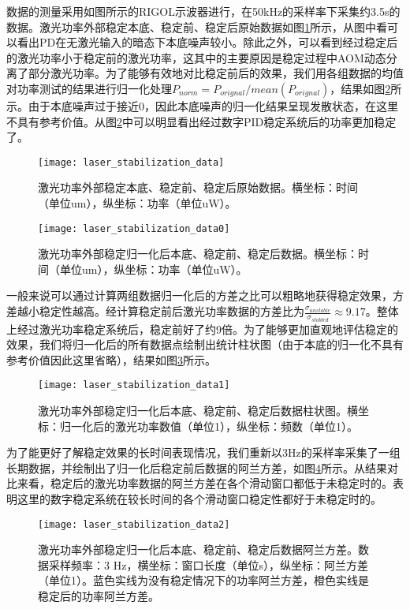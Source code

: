 数据的测量采用如图所示的RIGOL示波器进行，在50kHz的采样率下采集约3.5s的数据。激光功率外部稳定本底、稳定前、稳定后原始数据如图\ref{fig:laser_stabilization_data}所示，从图中看可以看出PD在无激光输入的暗态下本底噪声较小。除此之外，可以看到经过稳定后的激光功率小于稳定前的激光功率，这其中的主要原因是稳定过程中AOM动态分离了部分激光功率。为了能够有效地对比稳定前后的效果，我们用各组数据的均值对功率测试的结果进行归一化处理$P_{norm}=P_{orignal}/mean(P_{orignal})$，结果如图\ref{fig:laser_stabilization_data0}所示。由于本底噪声过于接近0，因此本底噪声的归一化结果呈现发散状态，在这里不具有参考价值。从图\ref{fig:laser_stabilization_data0}中可以明显看出经过数字PID稳定系统后的功率更加稳定了。

\begin{figure}
    \centering
    \caption[激光功率外部稳定原始数据]{激光功率外部稳定本底、稳定前、稳定后原始数据。横坐标：时间（单位um），纵坐标：功率（单位uW）。\label{fig:laser_stabilization_data}}
    \texttt{[image: laser\_stabilization\_data]}
\end{figure}

\begin{figure}
    \centering
    \caption[激光功率外部稳定归一化后数据]{激光功率外部稳定归一化后本底、稳定前、稳定后数据。横坐标：时间（单位um），纵坐标：功率（单位uW）。\label{fig:laser_stabilization_data0}}
    \texttt{[image: laser\_stabilization\_data0]}
\end{figure}

一般来说可以通过计算两组数据归一化后的方差之比可以粗略地获得稳定效果，方差越小稳定性越高。经计算稳定前后激光功率数据的方差比为$\frac{\sigma_{unstable}}{\sigma_{stabled}}\approx 9.17$。整体上经过激光功率稳定系统后，稳定前好了约9倍。为了能够更加直观地评估稳定的效果，我们将归一化后的所有数据点绘制出统计柱状图（由于本底的归一化不具有参考价值因此这里省略），结果如图\ref{fig:laser_stabilization_data1}所示。
\begin{figure}
    \centering
    \caption[激光功率外部稳定柱状图对比数据]{激光功率外部稳定归一化后本底、稳定前、稳定后数据柱状图。横坐标：归一化后的激光功率数值（单位1），纵坐标：频数（单位1）。\label{fig:laser_stabilization_data1}}
    \texttt{[image: laser\_stabilization\_data1]}
\end{figure}

为了能更好了解稳定效果的长时间表现情况，我们重新以3Hz的采样率采集了一组长期数据，并绘制出了归一化后稳定前后数据的阿兰方差，如图\ref{fig:laser_stabilization_data2}所示。从结果对比来看，稳定后的激光功率数据的阿兰方差在各个滑动窗口都低于未稳定时的。表明这里的数字稳定系统在较长时间的各个滑动窗口稳定性都好于未稳定时的。
\begin{figure}
    \centering
    \caption[激光功率外部稳定阿兰方差对比数据]{激光功率外部稳定归一化后本底、稳定前、稳定后数据阿兰方差。数据采样频率：3 Hz，横坐标：窗口长度（单位s），纵坐标：阿兰方差（单位1）。蓝色实线为没有稳定情况下的功率阿兰方差，橙色实线是稳定后的功率阿兰方差。\label{fig:laser_stabilization_data2}}
    \texttt{[image: laser\_stabilization\_data2]}
\end{figure}









